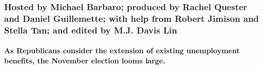 \hypertarget{hosted-by-michael-barbaro-produced-by-rachel-quester-and-daniel-guillemette-with-help-from-robert-jimison-and-stella-tan-and-edited-by-mj-davis-lin}{%
\subsubsection{Hosted by Michael Barbaro; produced by Rachel Quester and
Daniel Guillemette; with help from Robert Jimison and Stella Tan; and
edited by M.J. Davis
Lin}\label{hosted-by-michael-barbaro-produced-by-rachel-quester-and-daniel-guillemette-with-help-from-robert-jimison-and-stella-tan-and-edited-by-mj-davis-lin}}

\hypertarget{as-republicans-consider-the-extension-of-existing-unemployment-benefits-the-november-election-looms-large}{%
\paragraph{As Republicans consider the extension of existing
unemployment benefits, the November election looms
large.}\label{as-republicans-consider-the-extension-of-existing-unemployment-benefits-the-november-election-looms-large}}

